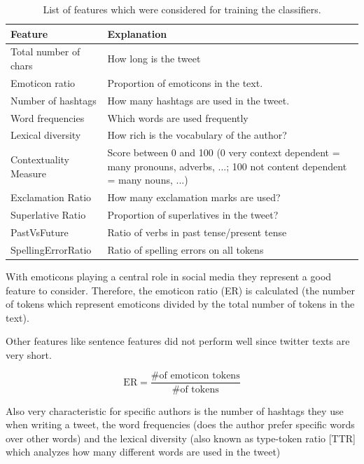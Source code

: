 \documentclass[journal, a4paper, 12pt]{IEEEtran}
\begin{document}
\begin{table}[!hbt]
	\begin{center}
		\caption{List of features which were considered for training the classifiers.}
		\label{tab:features}
		\begin{tabularx}{80mm}{| l | X |}
			\hline
			\rowcolor{lightgray}
			\textbf{Feature}			& \textbf{Explanation}						\\ \hline\hline
			Total number of chars		& How long is the tweet						\\ \hline
			Emoticon ratio		  	& Proportion of emoticons in the text. 			\\ \hline
			Number of hashtags		& How many hashtags are used in the tweet. 	\\ \hline
			Word frequencies        	& Which words are used frequently 				\\ \hline
			Lexical diversity			& How rich is the vocabulary of the author? 		\\ \hline
			Contextuality Measure		& Score between 0 and 100
								  	(0 very context dependent = many pronouns, adverbs, ...;
									100 not content dependent = many nouns, ...) 
																				\\ \hline
			Exclamation Ratio			& How many exclamation marks are used?		\\ \hline
			Superlative Ratio			& Proportion of superlatives in the tweet?		\\ \hline
			PastVsFuture				& Ratio of verbs in past tense/present tense		\\ \hline
			SpellingErrorRatio			& Ratio of spelling errors on all tokens		\\ \hline
			\hline
		\end{tabularx}
	\end{center}
\end{table}

With emoticons playing a central role in social media they represent a good feature to consider. Therefore, the emoticon ratio (ER) is calculated (the number of tokens which represent emoticons divided by the total number of tokens in the text).

Other features like sentence features did not perform well since twitter texts are very short.

\begin{equation}
	\text{ER} = \frac{\text{\# of emoticon tokens}}{\text{\# of tokens}}
\end{equation}

Also very characteristic for specific authors is the number of hashtags they use when writing a tweet, the word frequencies (does the author prefer specific words over other words) and the lexical diversity (also known as type-token ratio [TTR] which analyzes how many different words are used in the tweet)
\end{document}
